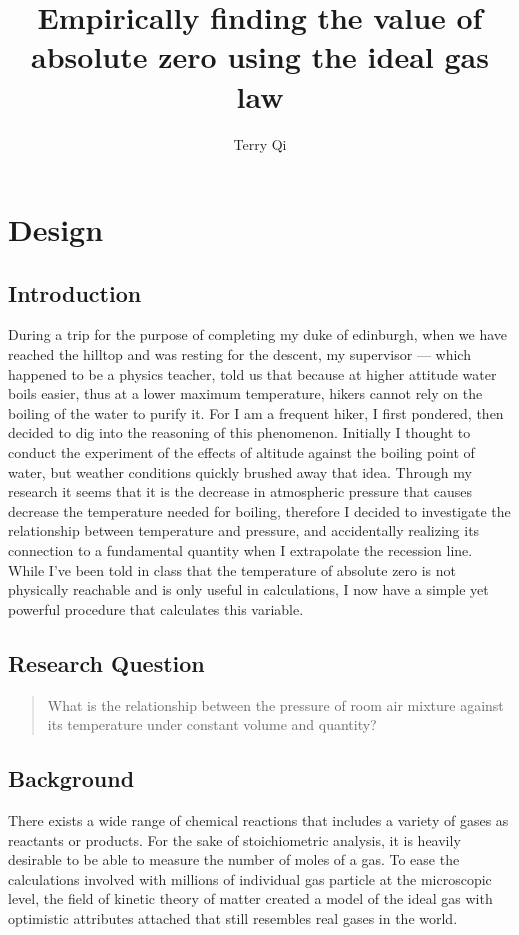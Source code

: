 \documentclass[a4paper,12pt]{article}
\title{Empirically finding the value of absolute zero using the ideal gas law}
\author{Terry Qi}
\begin{document}
\maketitle

\section{Design}
\subsection{Introduction}

During a trip for the purpose of completing my duke of edinburgh, when we have reached the hilltop and was resting for the descent, my supervisor --- which happened to be a physics teacher, told us that because at higher attitude water boils easier, thus at a lower maximum temperature, hikers cannot rely on the boiling of the water to purify it. For I am a frequent hiker, I first pondered, then decided to dig into the reasoning of this phenomenon. Initially I thought to conduct the experiment of the effects of altitude against the boiling point of water, but weather conditions quickly brushed away that idea. Through my research it seems that it is the decrease in atmospheric pressure that causes decrease the temperature needed for boiling, therefore I decided to investigate the relationship between temperature and pressure, and accidentally realizing its connection to a fundamental quantity when I extrapolate the recession line. While I've been told in class that the temperature of absolute zero is not physically reachable and is only useful in calculations, I now have a simple yet powerful procedure that calculates this variable.


\subsection{Research Question}
\begin{quote}
    What is the relationship between the pressure of room air mixture against its temperature under constant volume and quantity?
\end{quote}

\subsection{Background}
There exists a wide range of chemical reactions that includes a variety of gases as reactants or products. For the sake of stoichiometric analysis, it is heavily desirable to be able to measure the number of moles of a gas. To ease the calculations involved with millions of individual gas particle at the microscopic level, the field of kinetic theory of matter created a model of the ideal gas with optimistic attributes attached that still resembles real gases in the world.
\end{document}
